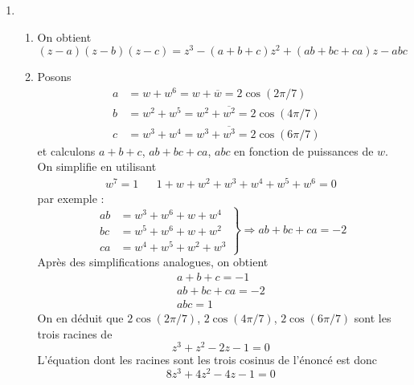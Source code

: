 \begin{enumerate}
\item
\begin{enumerate}
\item
On obtient
\begin{displaymath}
(z-a)(z-b)(z-c)=z^{3}-(a+b+c)z^{2}+(ab+bc+ca)z-abc 
\end{displaymath}
\item
Posons
\begin{align*}
a &= w+w^{6} = w + \overline{w} = 2\cos (2\pi /7)&\\
b &= w^{2}+w^{5} = w^2 + \overline{w^2}  = 2\cos (4\pi /7)&\\
c &= w^{3}+w^{4}  = w^3 + \overline{w^3} = 2\cos (6\pi /7)&
\end{align*}
et calculons $a+b+c$, $ab+bc+ca$, $abc$ en fonction de puissances de $w$. On simplifie en utilisant
\begin{align*}
 w^7 = 1 & & 1+w+w^2+w^3+w^4+w^5+w^6=0
\end{align*}
par exemple :
\begin{displaymath}
 \left. 
\begin{aligned}
 ab &= w^3+w^6+w+w^4\\
 bc &= w^5+w^6+w+w^2\\
 ca &= w^4+w^5+w^2+w^3
\end{aligned}
\right\rbrace \Rightarrow
ab+bc+ca = -2
\end{displaymath}
Après des simplifications analogues, on obtient
\begin{eqnarray*}
a+b+c=-1 \\ ab+bc+ca=-2 \\abc=1
\end{eqnarray*}
On en d{\'e}duit que $2\cos (2\pi /7)$, $2\cos (4\pi /7)$, $2\cos (6\pi /7)$ sont les trois racines de
$$z^{3}+z^{2}-2z-1=0$$
L'{\'e}quation dont les racines sont les trois cosinus de l'{\'e}nonc{\'e} est donc
$$8z^{3}+4z^{2}-4z-1=0$$
\end{enumerate}

\end{enumerate}
